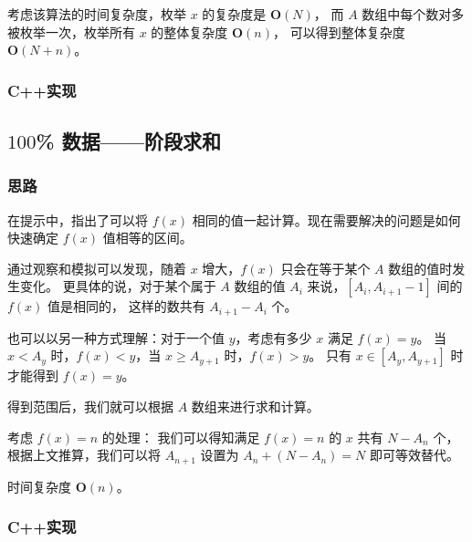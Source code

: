 考虑该算法的时间复杂度，枚举 $x$ 的复杂度是 $\mathbf{O}(N)$，
而 $A$ 数组中每个数对多被枚举一次，枚举所有 $x$ 的整体复杂度 $\mathbf{O}(n)$，
可以得到整体复杂度 $\mathbf{O}(N+n)$。

\subsubsection{C++实现}



\subsection{$100$\% 数据——阶段求和}

\subsubsection{思路}

在提示中，指出了可以将 $f(x)$ 相同的值一起计算。现在需要解决的问题是如何快速确定 $f(x)$ 值相等的区间。

通过观察和模拟可以发现，随着 $x$ 增大，$f(x)$ 只会在等于某个 $A$ 数组的值时发生变化。
更具体的说，对于某个属于 $A$ 数组的值 $A_i$ 来说，$[A_i,A_{i+1}-1]$ 间的 $f(x)$ 值是相同的，
这样的数共有 $A_{i+1}-A_i$ 个。

也可以以另一种方式理解：对于一个值 $y$，考虑有多少 $x$ 满足 $f(x)=y$。
当 $x<A_y$ 时，$f(x)<y$，当 $x\ge A_{y+1}$ 时，$f(x)>y$。
只有 $x\in [A_y,A_{y+1}]$ 时才能得到 $f(x)=y$。

得到范围后，我们就可以根据 $A$ 数组来进行求和计算。

考虑 $f(x)=n$ 的处理：
我们可以得知满足 $f(x)=n$ 的 $x$ 共有 $N-A_n$ 个，
根据上文推算，我们可以将 $A_{n+1}$ 设置为 $A_n+(N-A_n)=N$ 即可等效替代。

时间复杂度 $\mathbf{O}(n)$。

\subsubsection{C++实现}

